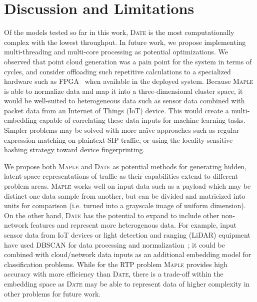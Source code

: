 \section{Discussion and Limitations}

Of the models tested so far in this work, \textsc{Date} is the most computationally complex with the lowest throughput. In future work, we propose implementing multi-threading and multi-core processing as potential optimizations. We observed that point cloud generation was a pain point for the system in terms of cycles, and consider offloading such repetitive calculations to a specialized hardware such as FPGA~\cite{Song2005EfficientPC} when available in the deployed system. Because \textsc{Maple} is able to normalize data and map it into a three-dimensional cluster space, it would be well-suited to heterogeneous data such as sensor data combined with packet data from an Internet of Things (IoT) device. This would create a multi-embedding capable of correlating these data inputs for machine learning tasks. Simpler problems may be solved with more naïve approaches such as regular expression matching on plaintext SIP traffic, or using the locality-sensitive hashing strategy toward device fingerprinting.

We propose both \textsc{Maple} and \textsc{Date} as potential methods for generating hidden, latent-space representations of traffic as their capabilities extend to different problem areas. \textsc{Maple} works well on input data such as a payload which may be distinct one data sample from another, but can be divided and matricized into units for comparison (i.e. turned into a grayscale image of uniform dimension). On the other hand, \textsc{Date} has the potential to expand to include other non-network features and represent more heterogenous data. For example, input sensor data from IoT devices or light detection and ranging (LiDAR) equipment have used DBSCAN for data processing and normalization~\cite{wanglidar2019}; it could be combined with cloud/network data inputs as an additional embedding model for classification problems. While for the RTP problem \textsc{Maple} provides high accuracy with more efficiency than \textsc{Date}, there is a trade-off within the embedding space as \textsc{Date} may be able to represent data of higher complexity in other problems for future work.
